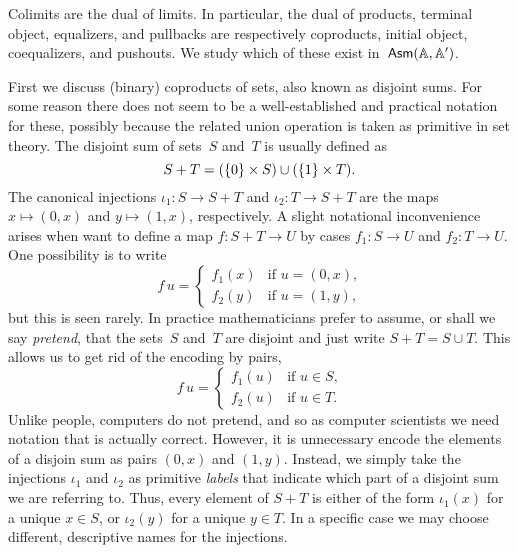 Colimits are the dual of limits. In particular, the dual of products,
terminal object, equalizers, and pullbacks are respectively
coproducts, initial object, coequalizers, and pushouts. We study which
of these exist in~$\mathsf{Asm}(\mathbb{A},\mathbb{A}')$.

First we discuss (binary) coproducts of sets, also known as disjoint
sums. For some reason there does not seem to be a well-established and
practical notation for these, possibly because the related union
operation is taken as primitive in set theory. The disjoint sum of
sets~$S$ and~$T$ is usually defined as
%
\begin{equation*}
  S + T = (\{0\} \times S) \cup (\{1\} \times T).
\end{equation*}
%
The canonical injections $\iota_1 : S \to S + T$ and $\iota_2 : T \to
S + T$ are the maps $x \mapsto (0,x)$ and $y \mapsto (1,x)$,
respectively. A slight notational inconvenience arises when want to
define a map $f : S + T \to U$ by cases $f_1 : S \to U$ and $f_2 : T
\to U$. One possibility is to write
%
\begin{equation*}
  f\,u =
  \begin{cases}
    f_1(x) & \text{if $u = (0,x)$,}\\
    f_2(y) & \text{if $u = (1,y)$,}
  \end{cases}
\end{equation*}
%
but this is seen rarely. In practice mathematicians prefer to assume,
or shall we say \emph{pretend}, that the sets~$S$ and~$T$ are disjoint
and just write $S + T = S \cup T$. This allows us to get rid of the
encoding by pairs,
%
\begin{equation*}
  f\,u =
  \begin{cases}
    f_1(u) & \text{if $u \in S$,}\\
   f_2(u) & \text{if $u \in T$.}
  \end{cases}
\end{equation*}
%
Unlike people, computers do not pretend, and so as computer scientists we need notation that is actually correct. However, it is unnecessary encode the elements of a disjoin sum as pairs $(0,x)$ and $(1,y)$. Instead, we simply take the injections $\iota_1$ and
$\iota_2$ as primitive \emph{labels} that indicate which part of a disjoint sum we are referring to.  Thus, every element of $S + T$ is either of the form $\iota_1(x)$ for a unique $x \in S$, or $\iota_2(y)$ for a unique $y \in T$. In a specific case we may choose different, descriptive names for the injections.

